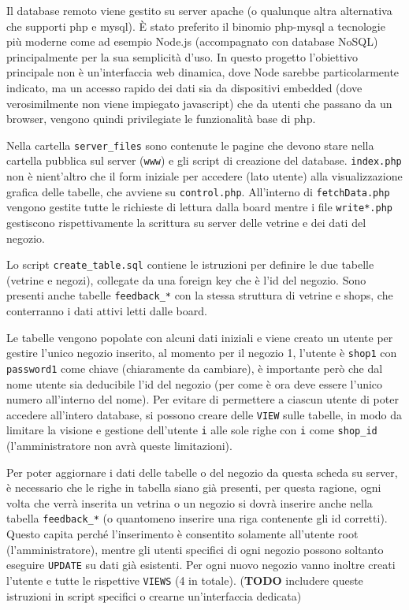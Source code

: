 Il database remoto viene gestito su server apache (o qualunque altra alternativa che supporti php e mysql). \`E stato preferito il binomio php-mysql a tecnologie pi\`u moderne come ad esempio Node.js (accompagnato con database NoSQL) principalmente per la sua semplicit\`a d'uso. In questo progetto l'obiettivo principale non \`e un'interfaccia web dinamica, dove Node sarebbe particolarmente indicato, ma un accesso rapido dei dati sia da dispositivi embedded (dove verosimilmente non viene impiegato javascript) che da utenti che passano da un browser, vengono quindi privilegiate le funzionalit\`a base di php.

Nella cartella \texttt{server\_files} sono contenute le pagine che devono stare nella cartella pubblica sul server (\texttt{www}) e gli script di creazione del database. \texttt{index.php} non \`e nient'altro che il form iniziale per accedere (lato utente) alla visualizzazione grafica delle tabelle, che avviene su \texttt{control.php}. All'interno di \texttt{fetchData.php} vengono gestite tutte le richieste di lettura dalla board mentre i file \texttt{write*.php} gestiscono rispettivamente la scrittura su server delle vetrine e dei dati del negozio.

Lo script \texttt{create\_table.sql} contiene le istruzioni per definire le due tabelle (vetrine e negozi), collegate da una foreign key che \`e l'id del negozio. Sono presenti anche tabelle \texttt{feedback\_*} con la stessa struttura di vetrine e shops, che conterranno i dati attivi letti dalle board.

Le tabelle vengono popolate con alcuni dati iniziali e viene creato un utente per gestire l'unico negozio inserito, al momento per il negozio 1, l'utente \`e \texttt{shop1} con \texttt{password1} come chiave (chiaramente da cambiare), \`e importante per\`o che dal nome utente sia deducibile l'id del negozio (per come \`e ora deve essere l'unico numero all'interno del nome). Per evitare di permettere a ciascun utente di poter accedere all'intero database, si possono creare delle \texttt{VIEW} sulle tabelle, in modo da limitare la visione e gestione dell'utente \texttt{i} alle sole righe con \texttt{i} come \texttt{shop\_id} (l'amministratore non avr\`a queste limitazioni).

Per poter aggiornare i dati delle tabelle o del negozio da questa scheda su server, \`e necessario che le righe in tabella siano gi\`a presenti, per questa ragione, ogni volta che verr\`a inserita un vetrina o un negozio si dovr\`a inserire anche nella tabella \texttt{feedback\_*} (o quantomeno inserire una riga contenente gli id corretti). Questo capita perch\'e l'inserimento \`e consentito solamente all'utente root (l'amministratore), mentre gli utenti specifici di ogni negozio possono soltanto eseguire \texttt{UPDATE} su dati gi\`a esistenti. Per ogni nuovo negozio vanno inoltre creati l'utente e tutte le rispettive \texttt{VIEWS} (4 in totale). (\textbf{TODO} includere queste istruzioni in script specifici o crearne un'interfaccia dedicata)

